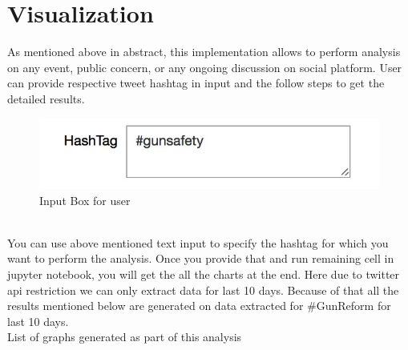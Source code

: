 \documentclass[journal, a4paper]{IEEEtran}
\begin{document}
\section{Visualization}
As mentioned above in abstract, this implementation allows to perform analysis on any event, public concern, or any ongoing discussion on social platform. User can provide respective tweet hashtag in input and the follow steps to get the detailed results.\\
\begin{figure}[!hbt]
		\begin{center}
		\includegraphics[width=\columnwidth]{Screen_Shot_2018-05-01_at_7_19_58_PM}
%
		\caption{Input Box for user}
		\label{fig:tf_plot}
		\end{center}
	\end{figure}
    \\You can use above mentioned text input to specify the hashtag for which you want to perform the analysis. Once you provide that and run remaining cell in jupyter notebook, you will get the all the charts at the end. Here due to twitter api restriction we can only extract data for last 10 days. Because of that all the results mentioned below are generated on data extracted for \#GunReform for last 10 days.\\
    List of graphs generated as part of this analysis
\end{document}
